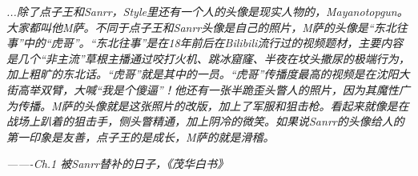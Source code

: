 \documentclass[UTF8]{ctexart}      %
\begin{document}
\textit{\noindent...除了点子王和Sanrr，Style里还有一个人的头像是现实人物的，Mayanotopgun。大家都叫他M萨。不同于点子王和Sanrr头像是自己的照片，M萨的头像是“东北往事”中的“虎哥”。“东北往事”是在18年前后在Bilibili流行过的视频题材，主要内容是几个“非主流”草根主播通过咬打火机、跳冰窟窿、半夜在坟头撒尿的极端行为，加上粗旷的东北话。“虎哥”就是其中的一员。“虎哥”传播度最高的视频是在沈阳大街高举双臂，大喊“我是个傻逼”！他还有一张半跪歪头瞥人的照片，因为其魔性广为传播。M萨的头像就是这张照片的改版，加上了军服和狙击枪。看起来就像是在战场上趴着的狙击手，侧头瞥精通，加上阴冷的微笑。如果说Sanrr的头像给人的第一印象是友善，点子王的是成长，M萨的就是滑稽。}
\begin{flushright}
\textit{-------Ch.1 被Sanrr替补的日子，《茂华白书》}
\end{flushright}
\end{document}
